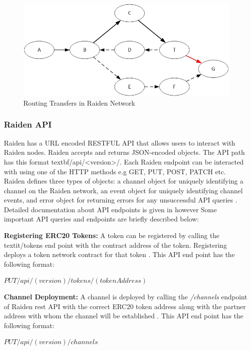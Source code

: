 \begin{figure}[h]
	\centering
    \includegraphics[width=120mm,scale=1]{figs/TransferRouting}
	\caption{Routing Transfers in Raiden Network \cite{rad:001}}
	\label{fig:TR}
\end{figure}

\vspace{0.5cm}
\subsubsection{Raiden API}	\label{R-API}	
Raiden has a URL encoded RESTFUL API that allows users to interact with Raiden nodes. Raiden accepts and returns JSON-encoded objects. The API path has this format textbf{/api/<version>/}. Each Raiden endpoint can be interacted with using one of the HTTP methods e.g GET, PUT, POST, PATCH etc. Raiden defines three types of objects: a channel object for uniquely identifying a channel on the Raiden network, an event object for uniquely identifying channel events, and error object for returning errors for any unsuccessful API queries \cite{rad:001}. Detailed documentation about API endpoints is given in \cite{rad:001} however Some important API queries and endpoints are briefly described below:

\textbf{Registering ERC20 Tokens:} A token can be registered by calling the textit{/tokens} end point with the contract address of the token. Registering deploys a token network contract for that token \cite{rad:001}. This API end point has the following format: 

\textbf{$PUT /api/(version)/tokens/(tokenAddress)$} \cite{rad:001}

\textbf{Channel Deployment:} A channel is deployed by calling the \textit{/channels} endpoint of Raiden rest API with the correct ERC20 token address along with the partner address with whom the channel will be established \cite{rad:001}. This API end point has the following format: 

\textbf{$PUT /api/(version)/channels$} \cite{rad:001}


